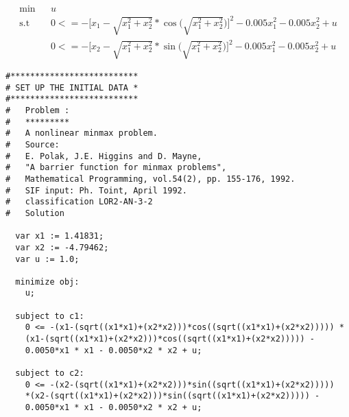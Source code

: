 \documentclass[a4paper]{article}
\begin{document}
\begin{eqnarray*}
  \min & & u \\
  \mbox{s.t} & &
    0 <= -\bigg[x_1-\sqrt{x_1^2+x_2^2}*\cos\bigg(\sqrt{x_1^2+x_2^2}\bigg)\bigg]^2
    - 0.005x_1^2 - 0.005x_2^2 + u \\
    & &
    0 <= -\bigg[x_2-\sqrt{x_1^2+x_2^2}*\sin\bigg(\sqrt{x_1^2+x_2^2}\bigg)\bigg]^2
    - 0.005x_1^2 - 0.005x_2^2 + u
\end{eqnarray*}

\begin{verbatim}
#**************************
# SET UP THE INITIAL DATA *
#**************************
#   Problem :
#   *********
#   A nonlinear minmax problem.
#   Source:
#   E. Polak, J.E. Higgins and D. Mayne,
#   "A barrier function for minmax problems",
#   Mathematical Programming, vol.54(2), pp. 155-176, 1992.
#   SIF input: Ph. Toint, April 1992.
#   classification LOR2-AN-3-2
#   Solution

  var x1 := 1.41831;
  var x2 := -4.79462;
  var u := 1.0;

  minimize obj:
    u;

  subject to c1:
    0 <= -(x1-(sqrt((x1*x1)+(x2*x2)))*cos((sqrt((x1*x1)+(x2*x2))))) *
    (x1-(sqrt((x1*x1)+(x2*x2)))*cos((sqrt((x1*x1)+(x2*x2))))) -
    0.0050*x1 * x1 - 0.0050*x2 * x2 + u;

  subject to c2:
    0 <= -(x2-(sqrt((x1*x1)+(x2*x2)))*sin((sqrt((x1*x1)+(x2*x2)))))
    *(x2-(sqrt((x1*x1)+(x2*x2)))*sin((sqrt((x1*x1)+(x2*x2))))) -
    0.0050*x1 * x1 - 0.0050*x2 * x2 + u;
\end{verbatim}
\end{document}
